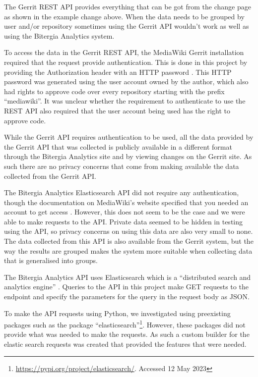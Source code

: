 The Gerrit REST API provides everything that can be got from the change page as shown in the example change above. When the data needs to be grouped by user and/or repository sometimes using the Gerrit API wouldn't work as well as using the Bitergia Analytics system.

To access the data in the Gerrit REST API, the MediaWiki Gerrit installation required that the request provide authentication. This is done in this project by providing the Authorization header with an HTTP password \citep{gerrit:authentication}. This HTTP password was generated using the user account owned by the author, which also had rights to approve code over every repository starting with the prefix ``mediawiki''. It was unclear whether the requirement to authenticate to use the REST API also required that the user account being used has the right to approve code.

While the Gerrit API requires authentication to be used, all the data provided by the Gerrit API that was collected is publicly available in a different format through the Bitergia Analytics site and by viewing changes on the Gerrit site. As such there are no privacy concerns that come from making available the data collected from the Gerrit API.

The Bitergia Analytics Elasticsearch API did not require any authentication, though the documentation on MediaWiki's website specified that you needed an account to get access \citep{mediawiki:community-metrics}. However, this does not seem to be the case and we were able to make requests to the API. Private data seemed to be hidden in testing using the API, so privacy concerns on using this data are also very small to none. The data collected from this API is also available from the Gerrit system, but the way the results are grouped makes the system more suitable when collecting data that is generalised into groups.

The Bitergia Analytics API uses Elasticsearch which is a ``distributed search and analytics engine'' \citep{elastic:elastic-search-intro}. Queries to the API in this project make GET requests to the endpoint and specify the parameters for the query in the request body as JSON.

To make the API requests using Python, we investigated using preexisting packages such as the package ``elasticsearch''\footnote{\url{https://pypi.org/project/elasticsearch/}. Accessed 12 May 2023}. However, these packages did not provide what was needed to make the requests. As such a custom builder for the elastic search requests was created that provided the features that were needed.

